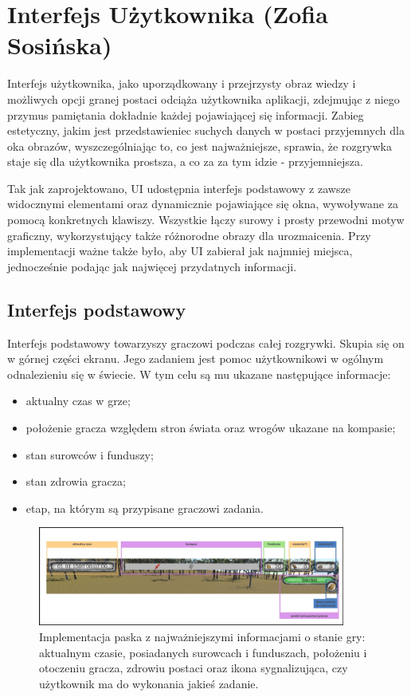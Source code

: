 \section{Interfejs Użytkownika (Zofia Sosińska)}\label{chap:ui_imp}
Interfejs użytkownika, jako uporządkowany i przejrzysty obraz wiedzy i możliwych opcji granej postaci odciąża użytkownika
aplikacji, zdejmując z niego przymus pamiętania dokładnie każdej pojawiającej się informacji. Zabieg estetyczny, jakim jest
przedstawieniec suchych danych w postaci przyjemnych dla oka obrazów, wyszczególniając to, co jest najważniejsze, sprawia, 
że rozgrywka staje się dla użytkownika prostsza, a co za za tym idzie - przyjemniejsza.

Tak jak zaprojektowano, UI udostępnia interfejs podstawowy z zawsze widocznymi elementami oraz dynamicznie pojawiające się okna, wywoływane za pomocą konkretnych klawiszy.
Wszystkie łączy surowy i prosty przewodni motyw graficzny, wykorzystujący także różnorodne obrazy dla urozmaicenia. Przy implementacji ważne także było, aby UI zabierał
jak najmniej miejsca, jednocześnie podając jak najwięcej przydatnych informacji.

\subsection{Interfejs podstawowy}
Interfejs podstawowy towarzyszy graczowi podczas całej rozgrywki. Skupia się on w górnej części ekranu. Jego zadaniem jest pomoc 
użytkownikowi w ogólnym odnalezieniu się w świecie. W tym celu są mu ukazane następujące informacje:
\begin{itemize}
    \item aktualny czas w grze;
    \item położenie gracza względem stron świata oraz wrogów ukazane na kompasie;
    \item stan surowców i funduszy;
    \item stan zdrowia gracza;
    \item etap, na którym są przypisane graczowi zadania.
\end{itemize}

\begin{figure}[htbp]
    \centering
    \includegraphics[width=0.9\textwidth]{images/ui/naszpasek.png}
    \caption{Implementacja paska z najważniejszymi informacjami o stanie gry: aktualnym czasie, posiadanych surowcach 
    i funduszach, położeniu i otoczeniu gracza, zdrowiu postaci oraz ikona sygnalizująca, czy użytkownik ma do wykonania jakieś zadanie.
    }\label{fig:naszpasek}
\end{figure}
\FloatBarrier

